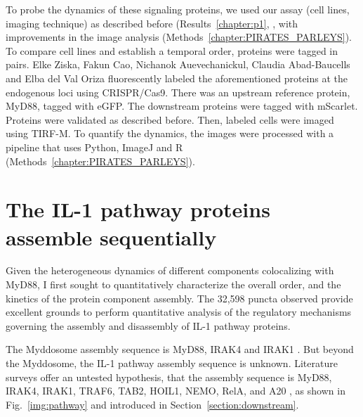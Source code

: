 To probe the dynamics of these signaling proteins, we used our assay (cell lines, imaging technique) as described before (Results~\ref{chapter:p1}, \autocite{Deliz-Aguirre_2021}, with improvements in the image analysis (Methods~\ref{chapter:PIRATES_PARLEYS}). To compare cell lines and establish a temporal order, proteins were tagged in pairs. Elke Ziska, Fakun Cao, Nichanok Auevechanickul, Claudia Abad-Baucells and Elba del Val Oriza fluorescently labeled the aforementioned proteins at the endogenous loci using CRISPR/Cas9. There was an upstream reference protein, MyD88, tagged with eGFP. The downstream proteins were tagged with mScarlet. Proteins were validated as described before. Then, labeled cells were imaged using TIRF-M. To quantify the dynamics, the images were processed with a pipeline that uses Python, ImageJ and R (Methods~\ref{chapter:PIRATES_PARLEYS}).

\section{The IL-1 pathway proteins assemble sequentially}
\label{section:IL1_seq}
Given the heterogeneous dynamics of different components colocalizing with MyD88, I first sought to quantitatively characterize the overall order, and the kinetics of the protein component assembly. The 32,598 puncta observed provide excellent grounds to perform quantitative analysis of the regulatory mechanisms governing the assembly and disassembly of IL-1 pathway proteins.

The Myddosome assembly sequence is MyD88, IRAK4 and IRAK1 \autocite{Lin_2010}\autocite{Deliz-Aguirre_2021}. But beyond the Myddosome, the IL-1 pathway assembly sequence is unknown. Literature surveys offer an untested hypothesis, that the assembly sequence is MyD88, IRAK4, IRAK1, TRAF6, TAB2, HOIL1, NEMO, RelA, and A20 \autocite{Cohen_2020}\autocite{Zarrin_2021}\autocite{Zinatizadeh_2021}, as shown in Fig.~\ref{img:pathway} and introduced in Section~\ref{section:downstream}. 

